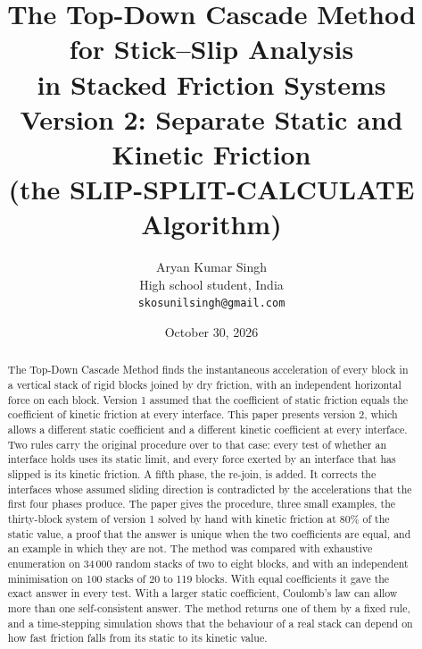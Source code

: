 \documentclass[11pt,a4paper]{article}
\begin{document}
\title{The Top-Down Cascade Method for Stick--Slip Analysis\\
in Stacked Friction Systems\\[6pt]
\large Version 2: Separate Static and Kinetic Friction\\
(the SLIP-SPLIT-CALCULATE Algorithm)}
\author{Aryan Kumar Singh\\[2pt]
\normalsize High school student, India\\[2pt]
\normalsize\texttt{skosunilsingh@gmail.com}}
\date{October 30, 2026}
\maketitle
\thispagestyle{plain}

\begin{abstract}
\noindent The Top-Down Cascade Method finds the instantaneous acceleration of every block in a vertical stack of rigid blocks joined by dry friction, with an independent horizontal force on each block. Version 1 assumed that the coefficient of static friction equals the coefficient of kinetic friction at every interface. This paper presents version 2, which allows a different static coefficient and a different kinetic coefficient at every interface. Two rules carry the original procedure over to that case: every test of whether an interface holds uses its static limit, and every force exerted by an interface that has slipped is its kinetic friction. A fifth phase, the re-join, is added. It corrects the interfaces whose assumed sliding direction is contradicted by the accelerations that the first four phases produce. The paper gives the procedure, three small examples, the thirty-block system of version 1 solved by hand with kinetic friction at 80\% of the static value, a proof that the answer is unique when the two coefficients are equal, and an example in which they are not. The method was compared with exhaustive enumeration on 34\,000 random stacks of two to eight blocks, and with an independent minimisation on 100 stacks of 20 to 119 blocks. With equal coefficients it gave the exact answer in every test. With a larger static coefficient, Coulomb's law can allow more than one self-consistent answer. The method returns one of them by a fixed rule, and a time-stepping simulation shows that the behaviour of a real stack can depend on how fast friction falls from its static to its kinetic value.
\end{abstract}

\tableofcontents
\end{document}
